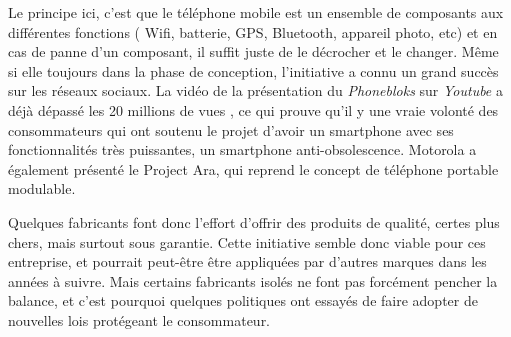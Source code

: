 \bigbreak
Le principe ici, c'est que le téléphone mobile est un ensemble de composants aux différentes fonctions ( Wifi, batterie, GPS, Bluetooth, appareil photo, etc) et en cas de panne d'un composant, il suffit juste de le décrocher et le changer. 
Même si elle toujours dans la phase de conception, l'initiative a connu un grand succès sur les réseaux sociaux. La vidéo de la présentation du \textit{Phonebloks} sur \textit{Youtube} a déjà dépassé les 20 millions de vues \cite{pb_yt}, ce qui prouve qu'il y une vraie volonté des consommateurs qui ont soutenu le projet d'avoir un smartphone avec ses fonctionnalités très puissantes, un smartphone anti-obsolescence. Motorola a également présenté le Project Ara, qui reprend le concept de téléphone portable modulable.

\bigbreak
Quelques fabricants font donc l'effort d'offrir des produits de qualité, certes plus chers, mais surtout sous garantie. Cette initiative semble donc viable pour ces entreprise, et pourrait peut-être être appliquées par d'autres marques dans les années à suivre. Mais certains fabricants isolés ne font pas forcément pencher la balance, et c'est pourquoi quelques politiques ont essayés de faire adopter de nouvelles lois protégeant le consommateur.









